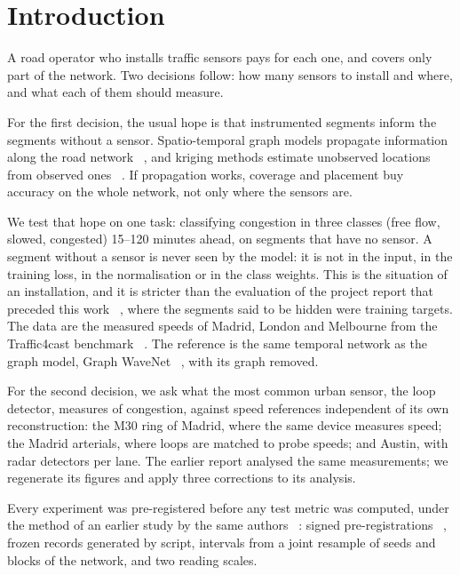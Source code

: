\section{Introduction}
A road operator who installs traffic sensors pays for each one, and covers only part of the network. Two decisions follow: how many sensors to install and where, and what each of them should measure.

For the first decision, the usual hope is that instrumented segments inform the segments without a sensor. Spatio-temporal graph models propagate information along the road network ~\cite{wu2019gwnet}, and kriging methods estimate unobserved locations from observed ones ~\cite{wu2021ignnk}. If propagation works, coverage and placement buy accuracy on the whole network, not only where the sensors are.

We test that hope on one task: classifying congestion in three classes (free flow, slowed, congested) 15–120 minutes ahead, on segments that have no sensor. A segment without a sensor is never seen by the model: it is not in the input, in the training loss, in the normalisation or in the class weights. This is the situation of an installation, and it is stricter than the evaluation of the project report that preceded this work ~\cite{motion2026uc04}, where the segments said to be hidden were training targets. The data are the measured speeds of Madrid, London and Melbourne from the Traffic4cast benchmark ~\cite{neun2023t4c}. The reference is the same temporal network as the graph model, Graph WaveNet ~\cite{wu2019gwnet}, with its graph removed.

For the second decision, we ask what the most common urban sensor, the loop detector, measures of congestion, against speed references independent of its own reconstruction: the M30 ring of Madrid, where the same device measures speed; the Madrid arterials, where loops are matched to probe speeds; and Austin, with radar detectors per lane. The earlier report analysed the same measurements; we regenerate its figures and apply three corrections to its analysis.

Every experiment was pre-registered before any test metric was computed, under the method of an earlier study by the same authors ~\cite{devito2026identity}: signed pre-registrations ~\cite{nosek2018prereg}, frozen records generated by script, intervals from a joint resample of seeds and blocks of the network, and two reading scales.


